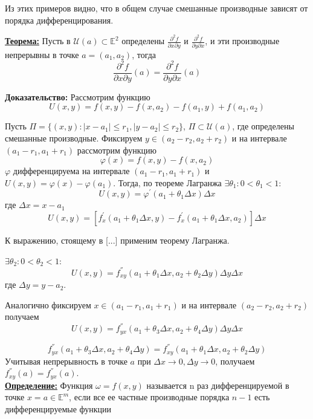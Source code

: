 \documentclass[a4paper,12pt]{article} %
\begin{document}
\begin{enumerate}
\end{enumerate}
	
Из этих примеров видно, что в общем случае смешанные производные зависят от порядка дифференцирования.
\vspace{5mm} 

\underline{\textbf{Теорема:}} Пусть в $\mathscr{U}(a) \subset \mathbb{E}^2$ определены $\frac{\partial^2f}{\partial x\partial y}$ и $\frac{\partial^2f}{\partial y\partial x}$, и эти производные непрерывны в точке $a = (a_1, a_2)$, тогда
\[
\frac{\partial^2f}{\partial{x}\partial{y}}(a) = \frac{\partial^2f}{\partial{y}\partial{x}}(a)
\]

\textbf{Доказательство:} Рассмотрим функцию
\[
	U(x, y) = f(x, y) - f(x, a_2) - f(a_1, y) + f(a_1, a_2)
\]

Пусть $\Pi = \{(x, y) : |x - a_1|\leqslant r_1, |y-a_2| \leqslant r_2\}$, $\Pi \subset \mathscr{U}(a)$, где определены смешанные производные. Фиксируем $y\in (a_2-r_2, a_2+r_2)$ и на интервале $(a_1-r_1, a_1+r_1)$ рассмотрим функцию 
\[
	\varphi(x) = f(x, y) - f(x, a_2)
\]
$\varphi$ дифференцируема на интервале $(a_1-r_1, a_1+r_1)$ и $U(x, y) = \varphi(x) - \varphi(a_1)$.
Тогда, по теореме Лагранжа $\exists \theta_1: 0<\theta_1<1$:
\[
	U(x, y) = \varphi^{'}(a_1 + \theta_1\Delta x)\Delta x
\]
где $\Delta x = x-a_1$
\[
	U(x, y) = [f^{'}_x(a_1+\theta_1\Delta x, y)-f^{'}_x(a_1+\theta_1\Delta x, a_2) ]\Delta x
\]

К выражению, стоящему в [...] применим теорему Лагранжа.

 $\exists\theta_2: 0<\theta_2<1$:
\[
	U(x, y) = f^{''}_{xy}(a_1+\theta_1\Delta x, a_2+\theta_2\Delta y)\Delta y\Delta x
\]
где $\Delta y = y-a_2$.
\vspace{5mm}

Аналогично фиксируем $x\in(a_1-r_1, a_1+r_1)$ и на интервале $(a_2-r_2, a_2+r_2)$ получаем
\[
	U(x, y) = f^{''}_{yx}(a_1+\theta_3\Delta x, a_2+\theta_4\Delta y)\Delta y\Delta x
\]

\[
	f^{''}_{yx}(a_1+\theta_3\Delta x, a_2+\theta_4\Delta y) = f^{''}_{xy}(a_1+\theta_1\Delta x, a_2+\theta_2\Delta y)
\]
Учитывая непрерывность в точке $a$ при $\Delta x\to0, \Delta y\to0$, получаем $f^{''}_{xy}(a) = f^{''}_{yx}(a)$.\\


\underline{\textbf{Определение:}} Функция $\omega = f(x, y)$ называется n раз дифференцируемой в точке $x = a\in \mathbb{E}^m$, если все ее частные производные порядка $n-1$ есть дифференцируемые функции
\vspace{5mm}
\end{document}
